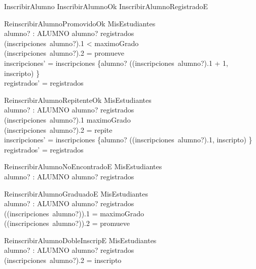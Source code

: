 \begin{zed}
    InscribirAlumno  InscribirAlumnoOk \lor InscribirAlumnoRegistradoE
\end{zed}

\begin{schema}{ReinscribirAlumnoPromovidoOk}
    \Delta MisEstudiantes \\
    alumno? : ALUMNO
    \where
    alumno? \in registrados \\
    (inscripciones~alumno?).1 < maximoGrado \\ 
    (inscripciones~alumno?).2 = promueve \\
    inscripciones' = inscripciones \oplus \{alumno? \mapsto ((inscripciones~alumno?).1 + 1, inscripto) \} \\
    registrados' = registrados
\end{schema}

\begin{schema}{ReinscribirAlumnoRepitenteOk}
    \Delta MisEstudiantes \\
    alumno? : ALUMNO
    \where
    alumno? \in registrados \\
    (inscripciones~alumno?).1 \leq maximoGrado \\ 
    (inscripciones~alumno?).2 = repite \\
    inscripciones' = inscripciones \oplus \{alumno? \mapsto ((inscripciones~alumno?).1, inscripto) \} \\
    registrados' = registrados
\end{schema}

\begin{schema}{ReinscribirAlumnoNoEncontradoE}
    \Xi MisEstudiantes \\
    alumno? : ALUMNO
    \where
    alumno? \notin registrados
\end{schema}

\begin{schema}{ReinscribirAlumnoGraduadoE}
    \Xi MisEstudiantes \\
    alumno? : ALUMNO
    \where
    alumno? \in registrados \\
    ((inscripciones~alumno?)).1 = maximoGrado \\
    ((inscripciones~alumno?)).2 = promueve 
\end{schema}

\begin{schema}{ReinscribirAlumnoDobleInscripE}
    \Xi MisEstudiantes \\
    alumno? : ALUMNO
    \where
    alumno? \in registrados \\
    (inscripciones~alumno?).2 = inscripto
\end{schema}

